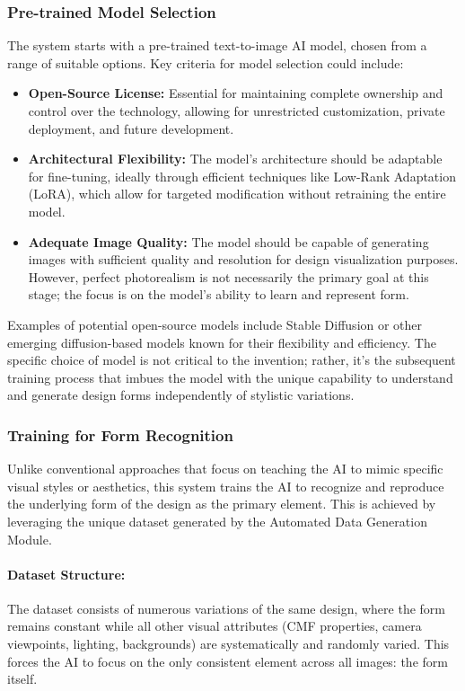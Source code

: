 \documentclass{article}
\begin{document}
\subsubsection{Pre-trained Model Selection}
The system starts with a pre-trained text-to-image AI model, chosen from a range of suitable options. Key criteria for model selection could include:

\begin{itemize}
    \item \textbf{Open-Source License:} Essential for maintaining complete ownership and control over the technology, allowing for unrestricted customization, private deployment, and future development.
    \item \textbf{Architectural Flexibility:} The model's architecture should be adaptable for fine-tuning, ideally through efficient techniques like Low-Rank Adaptation (LoRA), which allow for targeted modification without retraining the entire model.
    \item \textbf{Adequate Image Quality:} The model should be capable of generating images with sufficient quality and resolution for design visualization purposes. However, perfect photorealism is not necessarily the primary goal at this stage; the focus is on the model's ability to learn and represent form.
\end{itemize}

Examples of potential open-source models include Stable Diffusion or other emerging diffusion-based models known for their flexibility and efficiency. The specific choice of model is not critical to the invention; rather, it's the subsequent training process that imbues the model with the unique capability to understand and generate design forms independently of stylistic variations.

\subsubsection{Training for Form Recognition}
Unlike conventional approaches that focus on teaching the AI to mimic specific visual styles or aesthetics, this system trains the AI to recognize and reproduce the underlying form of the design as the primary element. This is achieved by leveraging the unique dataset generated by the Automated Data Generation Module.

\paragraph{Dataset Structure:} The dataset consists of numerous variations of the same design, where the form remains constant while all other visual attributes (CMF properties, camera viewpoints, lighting, backgrounds) are systematically and randomly varied. This forces the AI to focus on the only consistent element across all images: the form itself.
\end{document}

